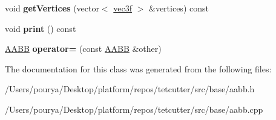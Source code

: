 \begin{DoxyCompactItemize}
\item 
\hypertarget{classps_1_1base_1_1AABB_afbda9a65280ca8e2a230b9803bccaf6f}{}void {\bfseries get\+Vertices} (vector$<$ \hyperlink{classps_1_1base_1_1Vec3}{vec3f} $>$ \&vertices) const \label{classps_1_1base_1_1AABB_afbda9a65280ca8e2a230b9803bccaf6f}

\item 
\hypertarget{classps_1_1base_1_1AABB_a004a216a39db123302c8bfb6a2bd19f9}{}void {\bfseries print} () const \label{classps_1_1base_1_1AABB_a004a216a39db123302c8bfb6a2bd19f9}

\item 
\hypertarget{classps_1_1base_1_1AABB_ad7fea866d8dac83fbf3080ec65bf2c9c}{}\hyperlink{classps_1_1base_1_1AABB}{A\+A\+B\+B} {\bfseries operator=} (const \hyperlink{classps_1_1base_1_1AABB}{A\+A\+B\+B} \&other)\label{classps_1_1base_1_1AABB_ad7fea866d8dac83fbf3080ec65bf2c9c}

\end{DoxyCompactItemize}


The documentation for this class was generated from the following files\+:\begin{DoxyCompactItemize}
\item 
/\+Users/pourya/\+Desktop/platform/repos/tetcutter/src/base/aabb.\+h\item 
/\+Users/pourya/\+Desktop/platform/repos/tetcutter/src/base/aabb.\+cpp\end{DoxyCompactItemize}
